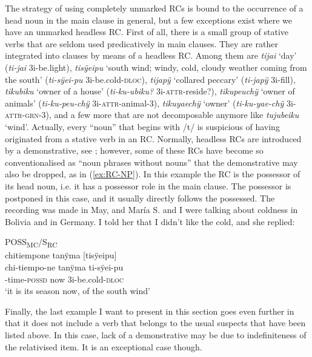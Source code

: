 The strategy of using completely unmarked RCs is bound to the occurrence of a head noun in the main clause in general, but a few exceptions exist where we have an unmarked headless RC. First of all, there is a small group of stative verbs  that are seldom used predicatively in main clauses. They are rather integrated into clauses by means of a headless RC. Among them are \textit{tijai} ‘day’ (\textit{ti-jai} 3i-be.light), \textit{tisÿeipu} ‘south wind; windy, cold, cloudy weather coming from the south’ (\textit{ti-sÿei-pu} 3i-be.cold-\textsc{dloc}), \textit{tijapÿ} ‘collared peccary’ (\textit{ti-japÿ} 3i-fill), \textit{tikubiku} ‘owner of a house’ (\textit{ti-ku-ubiku?} 3i-\textsc{attr}-reside?), \textit{tikupeuchÿ} ‘owner of animals’ (\textit{ti-ku-peu-chÿ} 3i-\textsc{attr}-animal-3), \textit{tikuyaechÿ} ‘owner’ (\mbox{\textit{ti-ku-yae-chÿ}} 3i-\textsc{attr}-\textsc{grn}-3), and a few more that are not decomposable anymore like \textit{tujubeiku} ‘wind’. Actually, every “noun” that begins with /t/ is suspicious of having originated from a stative verb in an RC. Normally, headless RCs are introduced by a demonstrative, see ; however, some of these RCs have become so conventionalised as “noun phrases without nouns” \citep[cf.][]{Dryer2004} that the demonstrative may also be dropped, as in (\ref{ex:RC-NP}). In this example the RC is the possessor of its head noun, i.e. it has a possessor role in the main clause. The possessor is postponed in this case, and it usually directly follows the possessed. The recording was made in May, and María S. and I were talking about coldness in Bolivia and in Germany. I told her that I didn’t like the cold, and she replied:

\ea\label{ex:RC-NP}
\begingl
\glpreamble \textup{POSS\textsubscript{MC}/S\textsubscript{RC}}\\chitiempone tanÿma \textup{[}tisÿeipu\textup{]}\\
\gla chi-tiempo-ne tanÿma ti-sÿei-pu\\
-time-\textsc{possd} now 3i-be.cold-\textsc{dloc}\\
\glft ‘it is its season now, of the south wind’
\endgl
\trailingcitation{[rxx-e120511l.293]}
\xe


Finally, the last example I want to present in this section goes even further in that it does not include a verb that belongs to the usual suspects that have been listed above. In this case, lack of a demonstrative may be due to indefiniteness of the relativised item. It is an exceptional case though. 

